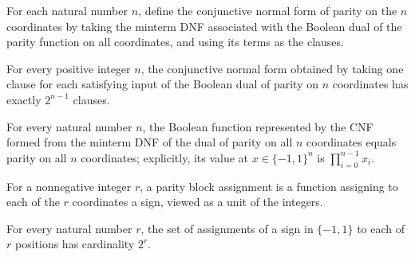 \begin{definition}
\label{FABL.parityCNF}
\leanok
{}
For each natural number $n$, define the conjunctive normal form of parity on the $n$
coordinates by taking the minterm DNF associated with the Boolean dual of the parity
function on all coordinates, and using its terms as the clauses.
\end{definition}

\begin{theorem}
\label{FABL.size_parityCNF}
\leanok
{}
For every positive integer $n$, the conjunctive normal form obtained by taking one
clause for each satisfying input of the Boolean dual of parity on $n$ coordinates has
exactly $2^{n-1}$ clauses.
\end{theorem}

\begin{theorem}
\label{FABL.parityCNF_toBooleanFunction}
\leanok
{}
For every natural number $n$, the Boolean function represented by the CNF formed from
the minterm DNF of the dual of parity on all $n$ coordinates equals parity on all $n$
coordinates; explicitly, its value at $x\in\{-1,1\}^n$ is $\prod_{i=0}^{n-1}x_i$.
\end{theorem}

\begin{definition}
\label{FABL.ParityBlockAssignment}
\leanok
{}
For a nonnegative integer $r$, a parity block assignment is a function assigning to each
of the $r$ coordinates a sign, viewed as a unit of the integers.
\end{definition}

\begin{theorem}
\label{FABL.card_parityBlockAssignment}
\leanok
{}
For every natural number $r$, the set of assignments of a sign in $\{ -1,1 \}$ to each
of $r$ positions has cardinality $2^r$.
\end{theorem}

